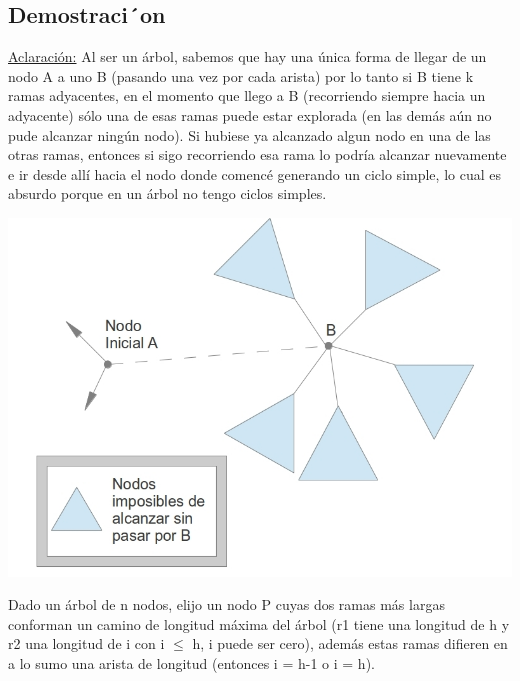 \subsection{Demostraci´on}

\underline{Aclaración:} Al ser un árbol, sabemos que hay una única forma de llegar de un nodo A a uno B (pasando una vez por cada arista) por lo tanto si B tiene k ramas adyacentes, en el momento que llego a B (recorriendo siempre hacia un adyacente) sólo una de esas ramas puede estar explorada (en las demás aún no pude alcanzar ningún nodo). Si hubiese ya alcanzado algun nodo en una de las otras ramas, entonces si sigo recorriendo esa rama lo podría alcanzar nuevamente e ir desde allí hacia el nodo donde comencé generando un ciclo simple, lo cual es absurdo porque en un árbol no tengo ciclos simples.
\begin{center}
\includegraphics[scale=0.5]{ej2/2/graficos/imagen02.jpg} 
\end{center}
Dado un árbol de n nodos, elijo un nodo P cuyas dos ramas más largas conforman un camino de longitud máxima del árbol (r1 tiene una longitud de h y r2 una longitud de i con i $\leq$ h, i puede ser cero), además estas ramas difieren en a lo sumo una arista de longitud (entonces i = h-1 o i = h).

